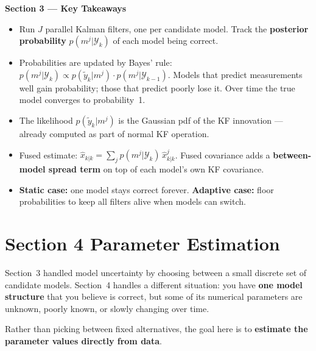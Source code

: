 \documentclass[12pt, a4paper]{article}
\begin{document}
\begin{keybox}
  \textbf{Section 3 --- Key Takeaways}
  \begin{itemize}[leftmargin=1.2em, itemsep=2pt]
    \item Run $J$ parallel Kalman filters, one per candidate model.
      Track the \textbf{posterior probability} $p(m^j|\mathcal{Y}_k)$ of
      each model being correct.
    \item Probabilities are updated by Bayes' rule:
      $p(m^j|\mathcal{Y}_k) \propto p(\tilde{y}_k|m^j) \cdot
      p(m^j|\mathcal{Y}_{k-1})$.
      Models that predict measurements well gain probability; those that
      predict poorly lose it.
      Over time the true model converges to probability~1.
    \item The likelihood $p(\tilde{y}_k|m^j)$ is the Gaussian pdf of
      the KF innovation --- already computed as part of normal KF
      operation.
    \item Fused estimate:
      $\hat{x}_{k|k} = \sum_j p(m^j|\mathcal{Y}_k)\,\hat{x}_{k|k}^j$.
      Fused covariance adds a \textbf{between-model spread term} on top
      of each model's own KF covariance.
    \item \textbf{Static case:} one model stays correct forever.
      \textbf{Adaptive case:} floor probabilities to keep all filters
      alive when models can switch.
  \end{itemize}
\end{keybox}

\clearpage
\section*{Section 4 \quad Parameter Estimation}

Section~3 handled model uncertainty by choosing between a small discrete
set of candidate models.
Section~4 handles a different situation: you have \textbf{one model
structure} that you believe is correct, but some of its numerical
parameters are unknown, poorly known, or slowly changing over time.

Rather than picking between fixed alternatives, the goal here is to
\textbf{estimate the parameter values directly from data}.

\end{document}
